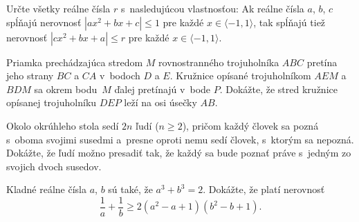 {%
Určte všetky reálne čísla $r$ s~nasledujúcou vlastnosťou: Ak reálne čísla $a$, $b$, $c$ spĺňajú nerovnosť $|ax^2+bx+c|\le 1$ pre každé $x\in\langle-1,1\rangle$, tak spĺňajú tiež nerovnosť $|cx^2+bx+a|\leq r$ pre každé $x\in\langle-1,1\rangle$.
}

{%
Priamka prechádzajúca stredom $M$ rovnostranného trojuholníka $ABC$ pretína jeho strany $BC$ a $CA$ v~bodoch $D$ a $E$. Kružnice opísané trojuholníkom $AEM$ a $BDM$ sa okrem bodu~$M$ ďalej pretínajú v~bode $P$. Dokážte, že stred kružnice opísanej trojuholníku $DEP$ leží na osi úsečky $AB$.
}

{%
Okolo okrúhleho stola sedí $2n$ ľudí ($n\ge2$), pričom každý človek sa pozná s~oboma svojimi susedmi a~presne oproti nemu sedí človek, s~ktorým sa nepozná. Dokážte, že ľudí možno presadiť tak, že každý sa bude poznať práve s~jedným zo svojich dvoch susedov.
}

{%
Kladné reálne čísla $a$, $b$ sú také, že $a^3+b^3=2$. Dokážte, že platí nerovnosť
$$
\frac1a+\frac1b\ge 2(a^2-a+1)(b^2-b+1).
$$
}
